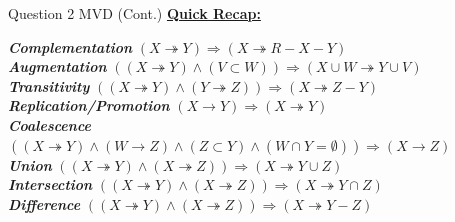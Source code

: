 \begin{frame}[fragile]{Question 2 MVD (Cont.)}
	\textbf{\underline{Quick Recap:}}\\\vspace{20pt}
	\begin{small}
	\textbf{\textit{Complementation}} $\left( X\twoheadrightarrow Y \right) \Longrightarrow \left( X\twoheadrightarrow R-X-Y \right) $
	 \\\vspace{5pt}
	\textbf{\textit{Augmentation}} $\left( \left( X\twoheadrightarrow Y \right) \land \left( V\subset W \right) \right) \Longrightarrow \left( X\cup W\twoheadrightarrow Y\cup V \right) $
	\\\vspace{5pt}
	\textbf{\textit{Transitivity}} $\left( \left( X\twoheadrightarrow Y \right) \land \left( Y\twoheadrightarrow Z \right) \right) \Longrightarrow \left( X\twoheadrightarrow Z-Y \right) 
	$\\\vspace{5pt}
	\textbf{\textit{Replication/Promotion}} $\left( X\rightarrow Y \right) \Longrightarrow \left( X\twoheadrightarrow Y \right) $ \\\vspace{5pt}
	\textbf{\textit{Coalescence}} $\left( \left( X\twoheadrightarrow Y \right) \land \left( W\rightarrow Z \right) \land \left( Z\subset Y \right) \land \left( W\cap Y=\emptyset \right) \right) \Longrightarrow \left( X\rightarrow Z \right) $ \\\vspace{5pt}
	\textbf{\textit{Union}} $\left( \left( X\twoheadrightarrow Y \right) \land \left( X\twoheadrightarrow Z \right) \right) \Longrightarrow \left( X\twoheadrightarrow Y\cup Z \right) $ \\\vspace{5pt}
	\textbf{\textit{Intersection}} $\left( \left( X\twoheadrightarrow Y \right) \land \left( X\twoheadrightarrow Z \right) \right) \Longrightarrow \left( X\twoheadrightarrow Y\cap Z \right) $ \\\vspace{5pt}
	\textbf{\textit{Difference}} $\left( \left( X\twoheadrightarrow Y \right) \land \left( X\twoheadrightarrow Z \right) \right) \Longrightarrow \left( X\twoheadrightarrow Y-Z \right) $ \\\vspace{5pt}
	\end{small}

\end{frame}
